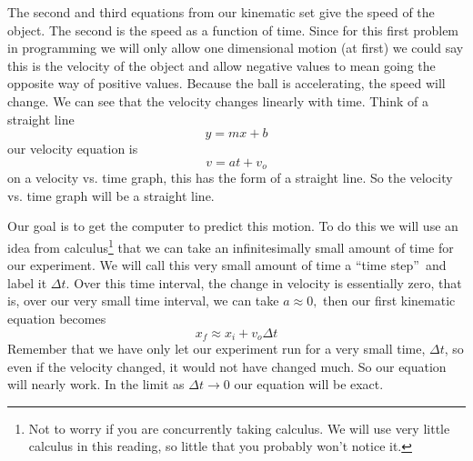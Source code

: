 \documentclass{book}
\begin{document}
 
\begin{center}
\end{center}
The second and third equations from our kinematic set give the speed of the
object. The second is the speed as a function of time. Since for this first
problem in programming we will only allow one dimensional motion (at first) we
could say this is the velocity of the object and allow negative values to mean
going the opposite way of positive values. Because the ball is accelerating,
the speed will change. We can see that the velocity changes linearly with
time. Think of a straight line
\[
y=mx+b
\]
our velocity equation is
\[
v=at+v_{o}
\]
on a velocity vs. time graph, this has the form of a straight line. So the
velocity vs. time graph will be a straight line. 
\begin{center}
\end{center}


Our goal is to get the computer to predict this motion. To do this we will use
an idea from calculus\footnote{Not to worry if you are concurrently taking
calculus. We will use very little calculus in this reading, so little that you
probably won't notice it.} that we can take an infinitesimally small amount of
time for our experiment. We will call this very small amount of time a
\textquotedblleft time step\textquotedblright\ and label it $\Delta t.$ Over
this time interval, the change in velocity is essentially zero, that is, over
our very small time interval, we can take $a\approx0,$ then our first
kinematic equation becomes
\[
x_{f}\approx x_{i}+v_{o}\Delta t
\]
Remember that we have only let our experiment run for a very small time,
$\Delta t$, so even if the velocity changed, it would not have changed much.
So our equation will nearly work. In the limit as $\Delta t\rightarrow0$ our
equation will be exact.
\end{document}
